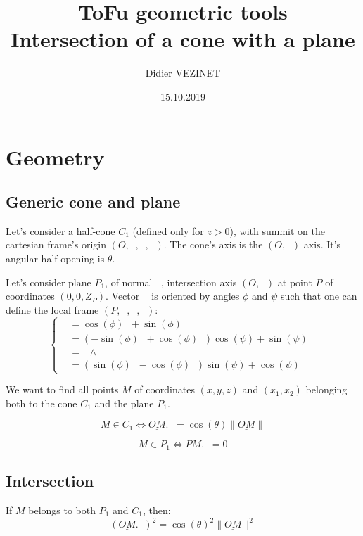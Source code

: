 \documentclass[a4paper,11pt,twoside,titlepage,openright]{book}
\numberwithin{equation}{section}
\newcommand{\lt}{\left}
\newcommand{\rt}{\right}
\DeclareMathOperator{\n}{\underline{n}}
\DeclareMathOperator{\ei}{\underline{e}_1}
\DeclareMathOperator{\et}{\underline{e}_2}
\DeclareMathOperator{\ex}{\underline{e}_x}
\DeclareMathOperator{\ey}{\underline{e}_y}
\DeclareMathOperator{\ez}{\underline{e}_z}
\newcommand{\wdg}{\wedge}
\begin{document}
\title{ToFu geometric tools\\ Intersection of a cone with a plane}
\author{Didier VEZINET}
\date{15.10.2019}
\maketitle

\tableofcontents

\chapter{Geometry}
\label{chap:Geometry}

\section{Generic cone and plane}

Let's consider a half-cone $C_1$ (defined only for $z > 0$), with summit on the cartesian frame's origin $(O, \ex, \ey, \ez)$.
The cone's axis is the $(O,\ez)$ axis.
It's angular half-opening is $\theta$.

Let's consider plane $P_1$, of normal $\n$, intersection axis $(O,\ez)$ at point $P$ of coordinates $(0,0,Z_P)$.
Vector $\n$ is oriented by angles $\phi$ and $\psi$ such that one can define the local frame $(P, \ei, \et, \n)$:
$$
\lt\{
	\begin{array}{ll}
		\ei & = \cos(\phi)\ex + \sin(\phi)\ey\\
		\et & = \lt(-\sin(\phi)\ex + \cos(\phi)\ey\rt)\cos(\psi) + \sin(\psi)\ez\\
		\n & = \ei \wdg \et\\
		   & = \lt( \sin(\phi)\ex - \cos(\phi)\ey \rt)\sin(\psi) + \cos(\psi)\ez
	\end{array}
\rt.
$$

We want to find all points $M$ of coordinates $(x, y, z)$ and $(x_1, x_2)$ belonging both to the cone $C_1$ and the plane $P_1$.

$$
M \in C_1 \Leftrightarrow \underline{OM}.\ez = \cos(\theta) \|\underline{OM}\|
$$

$$
M \in P_1 \Leftrightarrow \underline{PM}.\n = 0
$$


\section{Intersection}

If $M$ belongs to both $P_1$ and $C_1$, then:
$$
(\underline{OM}.\ez)^2 = \cos(\theta)^2 \|\underline{OM}\|^2
$$
\end{document}
